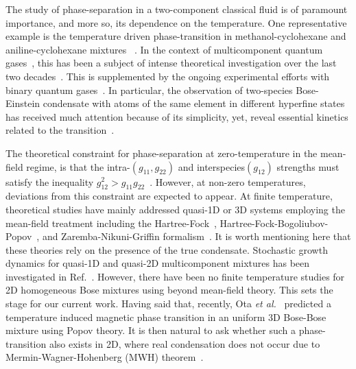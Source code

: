 \documentclass[pra,twocolumn,aps,showpacs,longbibliography]{revtex4-1}
\begin{document}
The study of phase-separation in a two-component classical fluid is of paramount importance, 
and more so, its dependence on the temperature. One representative example is the 
temperature driven phase-transition in methanol-cyclohexane and aniline-cyclohexane mixtures
~\cite{stanley_71,debye_62}. In the context of multicomponent quantum gases~\cite{pethick_08,pitaevskii_16}, 
this has been a subject of intense theoretical investigation over the last 
two decades~\cite{ho_96,timmermans_98,ao_98,trippenbach_2000,
schaeybroeck_08, wen_12, roy_15a,ota_19}. This is supplemented by the ongoing experimental efforts with binary 
quantum gases~\cite{modugno_02,thalhammer_08,lercher_11,mccarron_11,pasquiou_13,papp_08,tojo_10,nicklas_11}. 
In particular, the observation of two-species Bose-Einstein 
condensate  with atoms of the same element in different hyperfine states~\cite{myatt_97,stamper_kurn_98,stenger_98,
sadler_06} has received much attention because of its simplicity, yet, reveal essential kinetics
related to the transition~\cite{kawaguchi_12,stamperkurn_13}. 

The theoretical constraint for phase-separation at 
zero-temperature in the mean-field regime, is 
that the intra-$(g_{11},g_{22})$ and interspecies$(g_{12})$ strengths must satisfy the 
inequality $g_{12}^2 > g_{11}g_{22}$~\cite{pethick_08,pitaevskii_16}. 
However, at non-zero temperatures, deviations from this constraint are expected to appear.
At finite temperature, theoretical studies have mainly addressed quasi-1D or 3D systems
employing the mean-field treatment including the Hartree-Fock~\cite{ohberg_98,shi_2000,schaeybroeck_13}, 
Hartree-Fock-Bogoliubov-Popov~\cite{ohberg_99,roy_15a,armaitis_15},%
and Zaremba-Nikuni-Griffin formalism~\cite{lee_16,griffin_09}. It is worth mentioning here that these theories 
rely on the presence of the true condensate. Stochastic growth dynamics for quasi-1D and quasi-2D
multicomponent mixtures has been investigated in Ref.~\cite{su_11,liu_16}. However, there have been no finite 
temperature studies for 2D homogeneous Bose mixtures using beyond mean-field theory. This sets the stage
for our current work. Having said that, recently, Ota \emph{et al.}~\cite{ota_19} predicted a temperature 
induced magnetic phase transition in an uniform 3D Bose-Bose mixture using Popov theory. It is then natural to ask whether such a 
phase-transition also exists in 2D, where real condensation does not occur due to Mermin-Wagner-Hohenberg (MWH) 
theorem~\cite{hohenberg_65,mermin_66}.%
\end{document}
